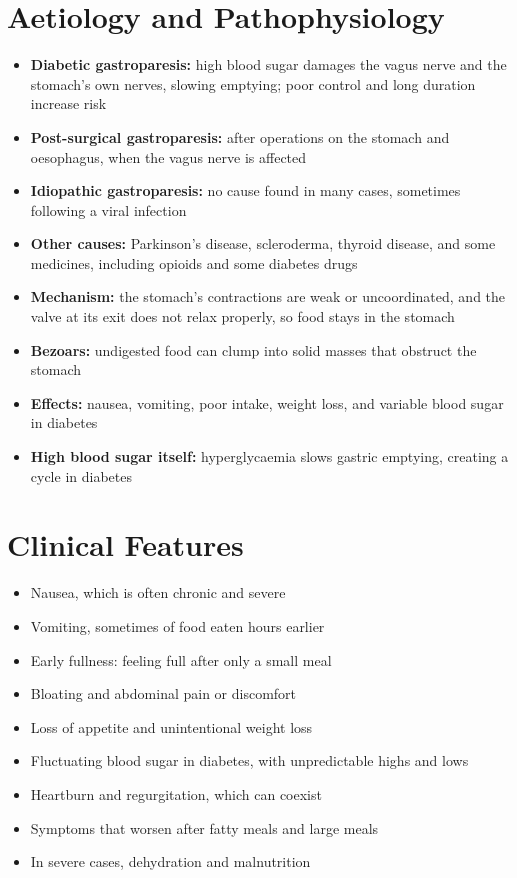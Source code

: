 \section*{Aetiology and Pathophysiology}
\begin{itemize}
    \item \textbf{Diabetic gastroparesis:} high blood sugar damages the vagus nerve and the stomach's own nerves, slowing emptying; poor control and long duration increase risk
    \item \textbf{Post-surgical gastroparesis:} after operations on the stomach and oesophagus, when the vagus nerve is affected
    \item \textbf{Idiopathic gastroparesis:} no cause found in many cases, sometimes following a viral infection
    \item \textbf{Other causes:} Parkinson's disease, scleroderma, thyroid disease, and some medicines, including opioids and some diabetes drugs
    \item \textbf{Mechanism:} the stomach's contractions are weak or uncoordinated, and the valve at its exit does not relax properly, so food stays in the stomach
    \item \textbf{Bezoars:} undigested food can clump into solid masses that obstruct the stomach
    \item \textbf{Effects:} nausea, vomiting, poor intake, weight loss, and variable blood sugar in diabetes
    \item \textbf{High blood sugar itself:} hyperglycaemia slows gastric emptying, creating a cycle in diabetes
\end{itemize}

\section*{Clinical Features}
\begin{itemize}
    \item Nausea, which is often chronic and severe
    \item Vomiting, sometimes of food eaten hours earlier
    \item Early fullness: feeling full after only a small meal
    \item Bloating and abdominal pain or discomfort
    \item Loss of appetite and unintentional weight loss
    \item Fluctuating blood sugar in diabetes, with unpredictable highs and lows
    \item Heartburn and regurgitation, which can coexist
    \item Symptoms that worsen after fatty meals and large meals
    \item In severe cases, dehydration and malnutrition
\end{itemize}

